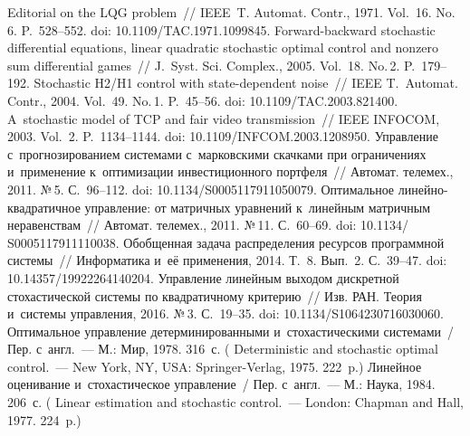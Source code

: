 \begin{multicols}{2}
{\small\frenchspacing
 {%
 \begin{thebibliography}{99}
 Editorial on the LQG problem~// IEEE~T. Automat. Contr., 1971. Vol.~16. 
No.\,6. P.~528--552. doi: 10.1109/TAC.1971.1099845.
 Forward-backward stochastic differential equations, linear quadratic stochastic 
optimal control and nonzero sum differential games~// J.~Syst. Sci. Complex., 2005. Vol.~18. 
No.\,2. P.~179--192.
 Stochastic H2/H1 control with state-dependent noise~// IEEE 
T.~Automat. Contr., 2004. Vol.~49. No.\,1. P.~45--56. doi: 10.1109/TAC.2003.821400.
 A~stochastic model of TCP and fair video transmission~// IEEE 
INFOCOM, 2003. Vol.~2. P.~1134--1144. doi: 10.1109/INFCOM.2003.1208950.
 Управление с~прогнозированием системами 
с~марковскими скачками при ограничениях и~применение к~оптимизации 
инвестиционного портфеля~// Автомат. телемех., 2011. №\,5. С.~96--112. doi: 
10.1134/S0005117911050079.
 Оптимальное линейно-квад\-ра\-тич\-ное управление: от 
матричных уравнений к~линейным матричным неравенствам~// Автомат. телемех., 2011. 
№\,11. С.~60--69. doi: 10.1134/ S0005117911110038.
 Обобщенная задача распределения ресурсов программной системы~// 
Информатика и~её применения, 2014. Т.~8. Вып.~2. С.~39--47. doi: 
10.14357/19922264140204.
 Управление линейным выходом дискретной стохастической системы по 
квадратичному критерию~// Изв. РАН. Теория и~системы управления, 2016. №\,3.  
С.~19--35. doi: 10.1134/S1064230716030060.
 Оптимальное управление детерминированными 
и~стохастическими системами~/ Пер. с~англ.~--- М.: Мир, 1978. 316~с. 
( Deterministic and stochastic optimal control.~--- New 
York, NY, USA: Springer-Verlag, 1975. 222~p.)
 Линейное оценивание и~стохастическое управление~/ Пер. с~англ.~--- 
М.: Наука, 1984. 206~с. ( Linear estimation and stochastic control.~--- 
London: Chapman and Hall, 1977. 224~p.)

 \end{thebibliography}

 }
 }

\end{multicols}

